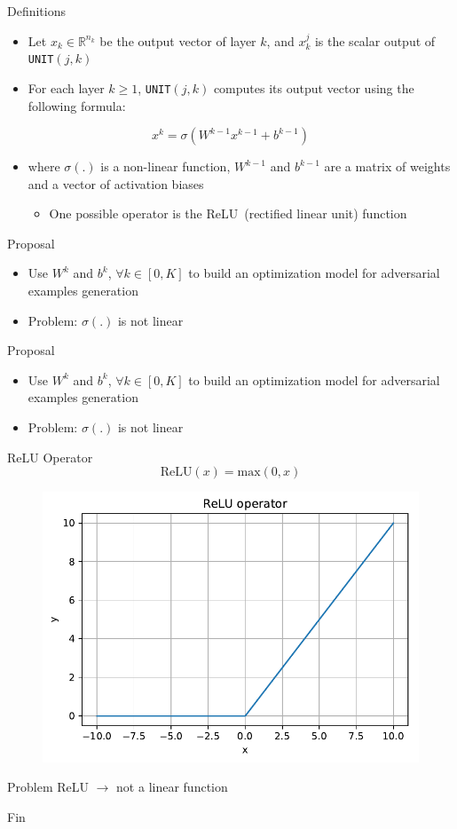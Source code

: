 \documentclass{beamer}
\begin{document}
\begin{frame}{Definitions}
  \begin{itemize}
  \item Let $x_k \in \mathbb{R}^{n_k}$ be the output vector of layer $k$, and $x^j_k$ is the scalar output of \texttt{UNIT}$(j,k)$
  \item For each layer $k \geq 1$, \texttt{UNIT}$(j,k)$ computes its output vector using the following formula:
  \end{itemize}
  $$
  x^k = \sigma(W^{k-1} x^{k-1} + b^{k-1})
  $$
  \begin{itemize}
  \item where $\sigma(.)$ is a non-linear function, $W^{k-1}$ and $b^{k-1}$ are a matrix of weights and a vector of activation biases
    \begin{itemize}
    \item One possible operator is the ReLU~(rectified linear unit) function
    \end{itemize}
  \end{itemize}
\end{frame}

\begin{frame}{Proposal}
\begin{itemize}
    \item Use $W^k$ and $b^k$, $\forall k \in [0, K]$ to build an optimization model for adversarial examples generation
    \item Problem: $\sigma(.)$ is not linear
\end{itemize}
\end{frame}

\begin{frame}{Proposal}
\begin{itemize}
    \item Use $W^k$ and $b^k$, $\forall k \in [0, K]$ to build an optimization model for adversarial examples generation
    \item Problem: $\sigma(.)$ is not linear
\end{itemize}
\end{frame}

\begin{frame}{ReLU Operator}
  $$ \text{ReLU}(x) = \text{max}(0, x) $$
  \begin{figure}[H]
    \centering
    \includegraphics[width=0.8\columnwidth]{relu}
  \end{figure}
\end{frame}

\begin{frame}{Problem}
  ReLU $ \rightarrow $ not a linear function
\end{frame}

\begin{frame}
  \Huge{\centerline{Fin}}
\end{frame}
\end{document}
